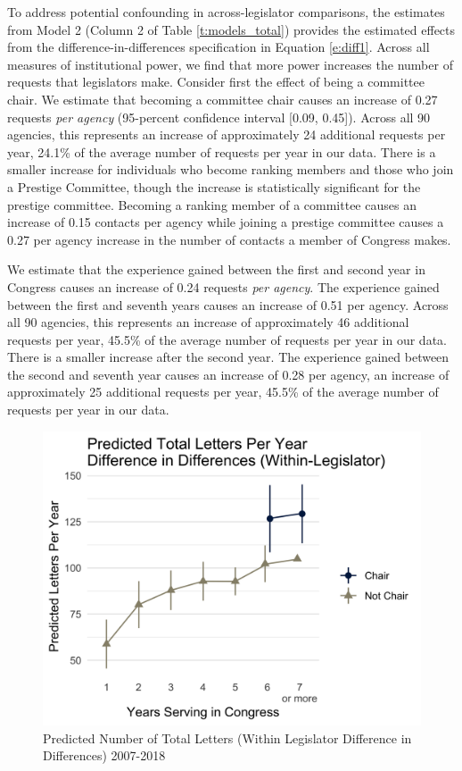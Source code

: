 \documentclass[12pt]{article}
\begin{document}
{To address potential confounding in across-legislator comparisons, the estimates from Model 2 (Column 2 of Table \ref{t:models_total}) provides the estimated effects from the difference-in-differences specification in Equation \ref{e:diff1}. Across all measures of institutional power, we find that more power increases the number of requests that legislators make. Consider first the effect of being a committee chair. We estimate that becoming a committee chair causes an increase of 0.27 requests \textit{per agency} (95-percent confidence interval [0.09, 0.45]). Across all 90 agencies, this represents an increase of approximately 24 additional requests per year, 24.1\% of the average number of requests per year in our data. There is a smaller increase for individuals who become ranking members and those who join a Prestige Committee, though the increase is statistically significant for the prestige committee. Becoming a ranking member of a committee causes an increase of 0.15 contacts per agency while joining a prestige committee causes a 0.27 per agency increase in the number of contacts a member of Congress makes.

We estimate that the experience gained between the first and second year in Congress causes an increase of 0.24 requests \textit{per agency}. The experience gained between the first and seventh years causes an increase of 0.51 per agency. Across all 90 agencies, this represents an increase of approximately 46 additional requests per year, 45.5\% of the average number of requests per year in our data. There is a smaller increase after the second year. The experience gained between the second and seventh year causes an increase of 0.28 per agency, an increase of approximately 25 additional requests per year, 45.5\% of the average number of requests per year in our data.



\begin{figure}[hbt!]
\centering
\caption{Predicted Number of Total Letters (Within Legislator Difference in Differences) 2007-2018} \label{f:m-total-predicted}
\includegraphics[width = .8\textwidth]{figs/m-total-predicted-4}
\end{figure}

}
\end{document}
